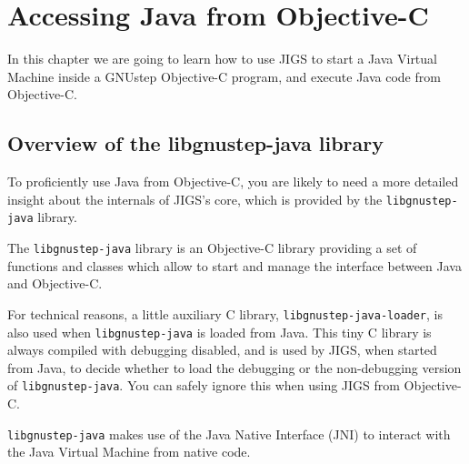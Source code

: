 \chapter{Accessing Java from Objective-C}

In this chapter we are going to learn how to use JIGS to start a Java
Virtual Machine inside a GNUstep Objective-C program, and execute Java
code from Objective-C.

\section{Overview of the libgnustep-java library}

To proficiently use Java from Objective-C, you are likely to need a
more detailed insight about the internals of JIGS's core, which is
provided by the \texttt{libgnustep-java} library.

The \texttt{libgnustep-java} library is an Objective-C library
providing a set of functions and classes which allow to start and
manage the interface between Java and Objective-C.

For technical reasons, a little auxiliary C library,
\texttt{libgnustep-java-loader}, is also used when \texttt{libgnustep-java} 
is loaded from Java.  This tiny C library is always compiled with
debugging disabled, and is used by JIGS, when started from Java, to
decide whether to load the debugging or the non-debugging version of 
\texttt{libgnustep-java}.  You can safely ignore this when using JIGS 
from Objective-C.

\texttt{libgnustep-java} makes use of the Java Native Interface (JNI) 
to interact with the Java Virtual Machine from native code.


